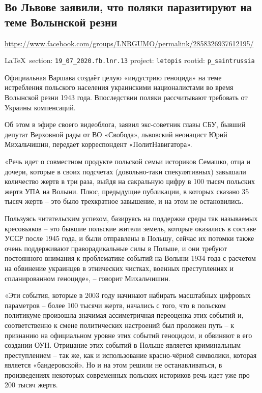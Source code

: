  
 
  
\subsection{Во Львове заявили, что поляки паразитируют на теме Волынской резни}
\url{https://www.facebook.com/groups/LNRGUMO/permalink/2858326937612195/}

\vspace{0.5cm}
{\small\LaTeX~section: \verb|19_07_2020.fb.lnr.13| project: \verb|letopis| rootid: \verb|p_saintrussia|}
\vspace{0.5cm}

Официальная Варшава создаёт целую «индустрию геноцида» на теме истребления
польского населения украинскими националистами во время Волынской резни 1943
года. Впоследствии поляки рассчитывают требовать от Украины компенсаций.

Об этом в эфире своего видеоблога, заявил экс-советник главы СБУ, бывший
депутат Верховной рады от ВО «Свобода», львовский неонацист Юрий Михальчишин,
передает корреспондент «ПолитНавигатора».

«Речь идет о совместном продукте польской семьи историков Семашко, отца и
дочери, которые в своих подсчетах (довольно-таки спекулятивных) завышали
количество жертв в три раза, выйдя на сакральную цифру в 100 тысяч польских
жертв УПА на Волыни. Плюс, предыдущие публикации, в которых сказано 35 тысяч
жертв – это было трехкратное завышение, и на этом не остановились.

Пользуясь читательским успехом, базируясь на поддержке среды так называемых
кресовьяков – это бывшие польские жители земель, которые оказались в составе
УССР после 1945 года, и были отправлены в Польшу, сейчас их потомки также очень
поддерживают праворадикальные силы в Польше, и они требуют постоянного внимания
к проблематике событий на Волыни 1934 года с расчетом на обвинение украинцев в
этнических чистках, военных преступлениях и спланированном геноциде», – говорит
Михальчишин.

«Эти события, которые в 2003 году начинают набирать масштабных цифровых
параметров – более 100 тысячи жертв, начались с того, что в польском политикуме
произошла значимая ассиметричная переоценка этих событий и, соответственно к
смене политических настроений был проложен путь – к признанию на официальном
уровне этих событий геноцидом, и обвиняют в его создании ОУН. Отрицание этих
событий в Польше является криминальным преступлением – так же, как и
использование красно-чёрной символики, которая является «бандеровской». Но и на
этом решили не останавливаться, в произведениях некоторых современных польских
историков речь идет уже про 200 тысяч жертв.

